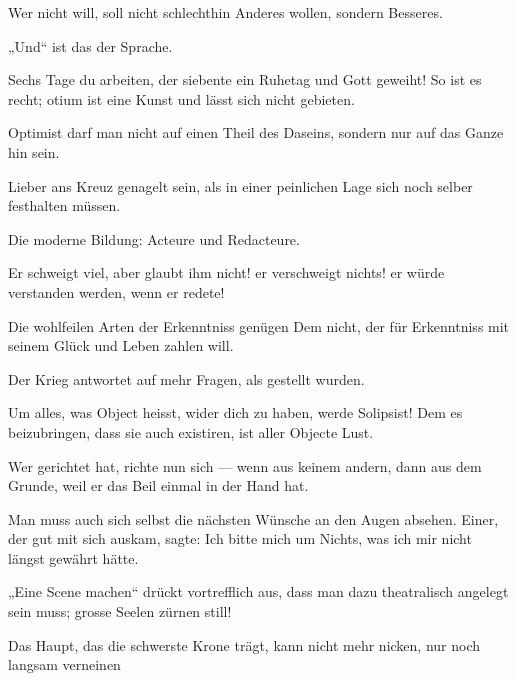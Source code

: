 Wer nicht  will, soll nicht schlechthin Anderes wollen, sondern Besseres.
\par

„Und“ ist das   der Sprache.
\par

Sechs Tage  du arbeiten, der siebente  ein Ruhetag und Gott geweiht! So ist es recht; otium ist eine Kunst und lässt sich nicht gebieten.
\par

Optimist darf man nicht auf einen Theil des Daseins, sondern nur auf das Ganze hin sein.
\par

Lieber ans Kreuz genagelt sein, als in einer peinlichen Lage sich noch selber festhalten müssen.
\par

Die moderne Bildung: Acteure und Redacteure.
\par

Er schweigt viel, aber glaubt ihm nicht! er verschweigt nichts! er würde verstanden werden, wenn er redete!
\par

Die wohlfeilen Arten der Erkenntniss genügen Dem nicht, der für Erkenntniss mit seinem Glück und Leben zahlen will.
\par

Der Krieg antwortet auf mehr Fragen, als gestellt wurden.
\par

Um alles, was Object heisst, wider dich zu haben, werde Solipsist! Dem es beizubringen, dass sie auch existiren, ist aller Objecte Lust.
\par

Wer gerichtet hat, richte nun sich — wenn aus keinem andern, dann aus dem Grunde, weil er das Beil einmal in der Hand hat.
\par

Man muss auch sich selbst die nächsten Wünsche an den Augen absehen. Einer, der gut mit sich auskam, sagte: Ich bitte mich um Nichts, was ich mir nicht längst gewährt hätte.
\par

„Eine Scene machen“ drückt vortrefflich aus, dass man dazu theatralisch angelegt sein muss; grosse Seelen zürnen still!
\par

Das Haupt, das die schwerste Krone trägt, kann nicht mehr nicken, nur noch langsam verneinen 
\par


